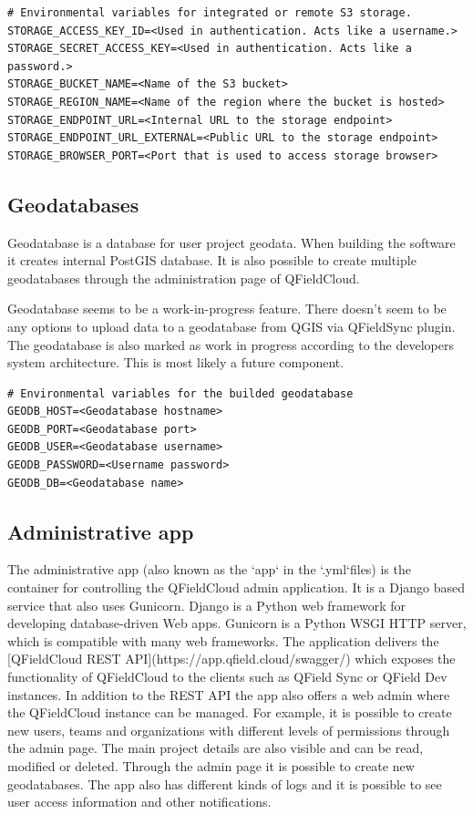 \documentclass{article}
\begin{document}
\begin{verbatim}
# Environmental variables for integrated or remote S3 storage.
STORAGE_ACCESS_KEY_ID=<Used in authentication. Acts like a username.>
STORAGE_SECRET_ACCESS_KEY=<Used in authentication. Acts like a password.>
STORAGE_BUCKET_NAME=<Name of the S3 bucket>
STORAGE_REGION_NAME=<Name of the region where the bucket is hosted>
STORAGE_ENDPOINT_URL=<Internal URL to the storage endpoint>
STORAGE_ENDPOINT_URL_EXTERNAL=<Public URL to the storage endpoint>
STORAGE_BROWSER_PORT=<Port that is used to access storage browser>
\end{verbatim}

\subsection{Geodatabases}
\begin{markdown}
Geodatabase is a database for user project geodata. When building the software it creates internal PostGIS database. It is also possible to create multiple geodatabases through the administration page of QFieldCloud.

Geodatabase seems to be a work-in-progress feature. There doesn't seem to be any options to upload data to a geodatabase from QGIS via QFieldSync plugin. The geodatabase is also marked as work in progress according to the developers system architecture. This is most likely a future component.
\end{markdown}

\begin{verbatim}
# Environmental variables for the builded geodatabase
GEODB_HOST=<Geodatabase hostname>
GEODB_PORT=<Geodatabase port>
GEODB_USER=<Geodatabase username>
GEODB_PASSWORD=<Username password>
GEODB_DB=<Geodatabase name>
\end{verbatim}

\subsection{Administrative app}
\begin{markdown}
The administrative app (also known as the `app` in the `.yml`files) is the container for controlling the QFieldCloud admin application. It is a Django based service that also uses Gunicorn. Django is a Python web framework for developing database-driven Web apps. Gunicorn is a Python WSGI HTTP server, which is compatible with many web frameworks. The application delivers the [QFieldCloud REST API](https://app.qfield.cloud/swagger/) which exposes the functionality of QFieldCloud to the clients such as QField Sync or QField Dev instances. In addition to the REST API the app also offers a web admin where the QFieldCloud instance can be managed. For example, it is possible to create new users, teams and organizations  with different levels of permissions through the admin page. The main project details are also visible and can be read, modified or deleted. Through the admin page it is possible to create new geodatabases. The app also has different kinds of logs and it is possible to see user access information and other notifications.
\end{markdown}
\end{document}

